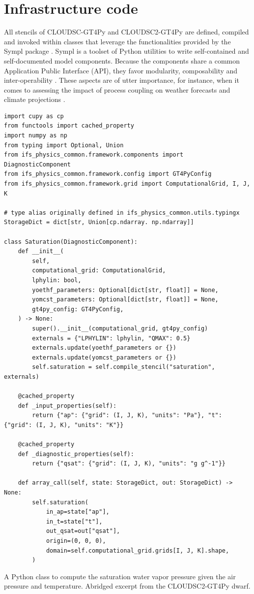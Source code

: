 \documentclass[gmd,manuscript,online]{copernicus}
\theoremstyle{theorem}
\theoremstyle{definition}
\theoremstyle{remark}
\theoremstyle{proposition}
\begin{document}
	\section{Infrastructure code}
	\label{section:infrastructure-code}

	All stencils of CLOUDSC-GT4Py and CLOUDSC2-GT4Py are defined, compiled and invoked within classes that leverage the functionalities provided by the Sympl package \citep{monteiro18}. Sympl is a toolset of Python utilities to write self-contained and self-documented model components. Because the components share a common Application Public Interface (API), they favor modularity, composability and inter-operability \citep{schaer19}. These aspects are of utter importance, for instance, when it comes to assessing the impact of process coupling on weather forecasts and climate projections \citep{ubbiali21}.

	\begin{listing}[t!]
		\begin{verbatim}
import cupy as cp
from functools import cached_property
import numpy as np
from typing import Optional, Union
from ifs_physics_common.framework.components import DiagnosticComponent
from ifs_physics_common.framework.config import GT4PyConfig
from ifs_physics_common.framework.grid import ComputationalGrid, I, J, K

# type alias originally defined in ifs_physics_common.utils.typingx
StorageDict = dict[str, Union[cp.ndarray. np.ndarray]]

class Saturation(DiagnosticComponent):
    def __init__(
        self,
        computational_grid: ComputationalGrid,
        lphylin: bool,
        yoethf_parameters: Optional[dict[str, float]] = None,
        yomcst_parameters: Optional[dict[str, float]] = None,
        gt4py_config: GT4PyConfig,
    ) -> None:
        super().__init__(computational_grid, gt4py_config)
        externals = {"LPHYLIN": lphylin, "QMAX": 0.5}
        externals.update(yoethf_parameters or {})
        externals.update(yomcst_parameters or {})
        self.saturation = self.compile_stencil("saturation", externals)

    @cached_property
    def _input_properties(self):
        return {"ap": {"grid": (I, J, K), "units": "Pa"}, "t": {"grid": (I, J, K), "units": "K"}}

    @cached_property
    def _diagnostic_properties(self):
        return {"qsat": {"grid": (I, J, K), "units": "g g^-1"}}

    def array_call(self, state: StorageDict, out: StorageDict) -> None:
        self.saturation(
            in_ap=state["ap"],
            in_t=state["t"],
            out_qsat=out["qsat"],
            origin=(0, 0, 0),
            domain=self.computational_grid.grids[I, J, K].shape,
        )
		\end{verbatim}

		\caption{A Python class to compute the saturation water vapor pressure given the air pressure and temperature. Abridged excerpt from the CLOUDSC2-GT4Py dwarf.}
		\label{lst:saturation-infrastructure}
	\end{listing}
\end{document}
